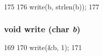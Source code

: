 \begin{DoxyCode}
175 {
176     write(b, strlen(b));
177 }
\end{DoxyCode}
\hypertarget{classCircleBuf_a03ed9bf9f1a85f8085db042491f62b1d}{
\subsubsection[{write}]{\setlength{\rightskip}{0pt plus 5cm}void write (char {\em b})}}
\label{classCircleBuf_a03ed9bf9f1a85f8085db042491f62b1d}



\begin{DoxyCode}
169 {
170     write(&b, 1);
171 }
\end{DoxyCode}


